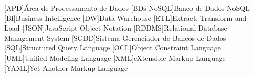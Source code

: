 \begin{acronym}[ACRONYM] 

[APD]{Área de Processamento de Dados}
[BDs NoSQL]{Banco de Dados NoSQL}
[BI]{Business Intelligence}
[DW]{Data Warehouse}
[ETL]{Extract, Transform and Load}
[JSON]{JavaScript Object Notation}
[RDBMS]{Relational Database Management System}
[SGBD]{Sistema Gerenciador de Bancos de Dados}
[SQL]{Structured Query Language}
[OCL]{Object Constraint Language}
[UML]{Unified Modeling Language}
[XML]{eXtensible Markup Language}
[YAML]{Yet Another Markup Language}



\end{acronym}